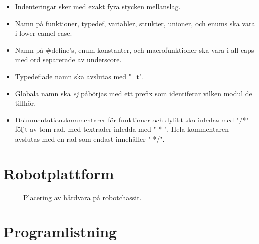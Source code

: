 \documentclass[a4paper,11pt]{article}
\begin{document}
\begin{appendices}
\begin{itemize}
    \item Indenteringar sker med exakt fyra stycken mellanslag.
    \item Namn på funktioner, typedef, variabler, strukter, unioner, och enums ska vara i lower camel case.
    \item Namn på \#define's, enum-konstanter, och macrofunktioner ska vara i all-caps med ord separerade av underscore.
    \item Typedef:ade namn ska avslutas med "\_t".
    \item Globala namn ska \textit{ej} påbörjas med ett prefix som identiferar vilken modul de tillhör.
    \item Dokumentationskommentarer för funktioner och dylikt ska inledas med "/*" följt av tom rad, med textrader inledda med "{ }* ". Hela kommentaren avslutas med en rad som endast innehåller "{ }*/".
\end{itemize}

\clearpage
\section{Robotplattform}
\label{app:placement}
\begin{figure}[h!]
    \caption{Placering av hårdvara på robotchassit.}
    \label{fig:placement}
\end{figure}
\end{appendices}

\clearpage
\section{Programlistning}



\clearpage
{} %
\printbibliography
\end{document}
